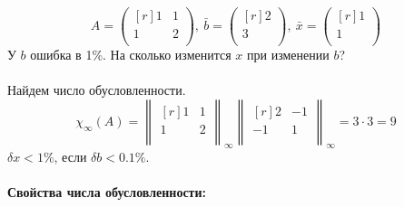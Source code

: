 \documentclass[12pt]{article}
\theoremstyle{definition}
\numberwithin{equation}{section}
\begin{document}
\[A=\begin{pmatrix}[r]
1 & 1 \\
1 & 2 \\
\end{pmatrix},~ \bar b=\begin{pmatrix}[r]
2 \\
3 \\
\end{pmatrix}, ~\bar x=\begin{pmatrix}[r]
1 \\
1 \\
\end{pmatrix}\]
У $b$ ошибка в 1\%. На сколько изменится $x$ при изменении $b$?\\ \\
Найдем число обусловленности.
\[\chi_{\infty}(A) = \begin{Vmatrix}[r]
1 & 1 \\
1 & 2 \\
\end{Vmatrix}_{\infty} \begin{Vmatrix}[r]
2 & -1 \\
-1 & 1 \\
\end{Vmatrix}_{\infty} = 3\cdot 3 = 9\]
$\delta x < 1\%$, если $\delta b < 0.1 \%$.\\
\\
\textbf{Свойства числа обусловленности:}
\end{document}
